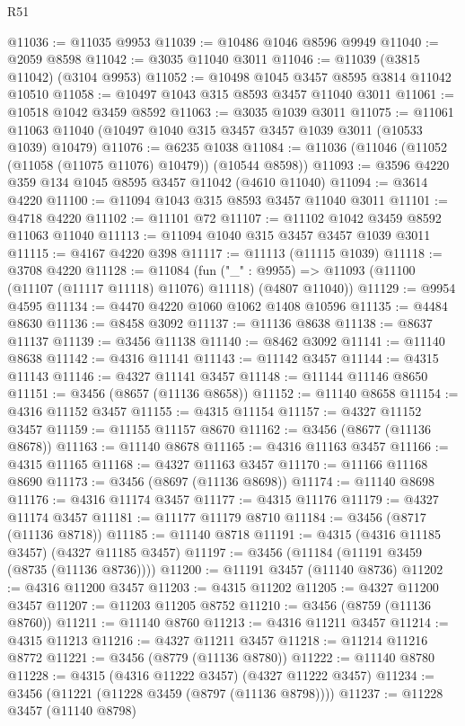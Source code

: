\begin{lexlean}{R51}
\begin{coremodule}
@11036 := @11035 @9953
@11039 := @10486 @1046 @8596 @9949
@11040 := @2059 @8598
@11042 := @3035 @11040 @3011
@11046 := @11039 (@3815 @11042) (@3104 @9953)
@11052 := @10498 @1045 @3457 @8595 @3814 @11042 @10510
@11058 := @10497 @1043 @315 @8593 @3457 @11040 @3011
@11061 := @10518 @1042 @3459 @8592
@11063 := @3035 @1039 @3011
@11075 := @11061 @11063 @11040 (@10497 @1040 @315 @3457 @3457 @1039 @3011 (@10533 @1039) @10479)
@11076 := @6235 @1038
@11084 := @11036 (@11046 (@11052 (@11058 (@11075 @11076) @10479)) (@10544 @8598))
@11093 := @3596 @4220 @359 @134 @1045 @8595 @3457 @11042 (@4610 @11040)
@11094 := @3614 @4220
@11100 := @11094 @1043 @315 @8593 @3457 @11040 @3011
@11101 := @4718 @4220
@11102 := @11101 @72
@11107 := @11102 @1042 @3459 @8592 @11063 @11040
@11113 := @11094 @1040 @315 @3457 @3457 @1039 @3011
@11115 := @4167 @4220 @398
@11117 := @11113 (@11115 @1039)
@11118 := @3708 @4220
@11128 := @11084
    (fun ("_" : @9955) => @11093 (@11100 (@11107 (@11117 @11118) @11076) @11118) (@4807 @11040))
@11129 := @9954 @4595
@11134 := @4470 @4220 @1060 @1062 @1408 @10596
@11135 := @4484 @8630
@11136 := @8458 @3092
@11137 := @11136 @8638
@11138 := @8637 @11137
@11139 := @3456 @11138
@11140 := @8462 @3092
@11141 := @11140 @8638
@11142 := @4316 @11141
@11143 := @11142 @3457
@11144 := @4315 @11143
@11146 := @4327 @11141 @3457
@11148 := @11144 @11146 @8650
@11151 := @3456 (@8657 (@11136 @8658))
@11152 := @11140 @8658
@11154 := @4316 @11152 @3457
@11155 := @4315 @11154
@11157 := @4327 @11152 @3457
@11159 := @11155 @11157 @8670
@11162 := @3456 (@8677 (@11136 @8678))
@11163 := @11140 @8678
@11165 := @4316 @11163 @3457
@11166 := @4315 @11165
@11168 := @4327 @11163 @3457
@11170 := @11166 @11168 @8690
@11173 := @3456 (@8697 (@11136 @8698))
@11174 := @11140 @8698
@11176 := @4316 @11174 @3457
@11177 := @4315 @11176
@11179 := @4327 @11174 @3457
@11181 := @11177 @11179 @8710
@11184 := @3456 (@8717 (@11136 @8718))
@11185 := @11140 @8718
@11191 := @4315 (@4316 @11185 @3457) (@4327 @11185 @3457)
@11197 := @3456 (@11184 (@11191 @3459 (@8735 (@11136 @8736))))
@11200 := @11191 @3457 (@11140 @8736)
@11202 := @4316 @11200 @3457
@11203 := @4315 @11202
@11205 := @4327 @11200 @3457
@11207 := @11203 @11205 @8752
@11210 := @3456 (@8759 (@11136 @8760))
@11211 := @11140 @8760
@11213 := @4316 @11211 @3457
@11214 := @4315 @11213
@11216 := @4327 @11211 @3457
@11218 := @11214 @11216 @8772
@11221 := @3456 (@8779 (@11136 @8780))
@11222 := @11140 @8780
@11228 := @4315 (@4316 @11222 @3457) (@4327 @11222 @3457)
@11234 := @3456 (@11221 (@11228 @3459 (@8797 (@11136 @8798))))
@11237 := @11228 @3457 (@11140 @8798)

\end{coremodule}
\end{lexlean}
